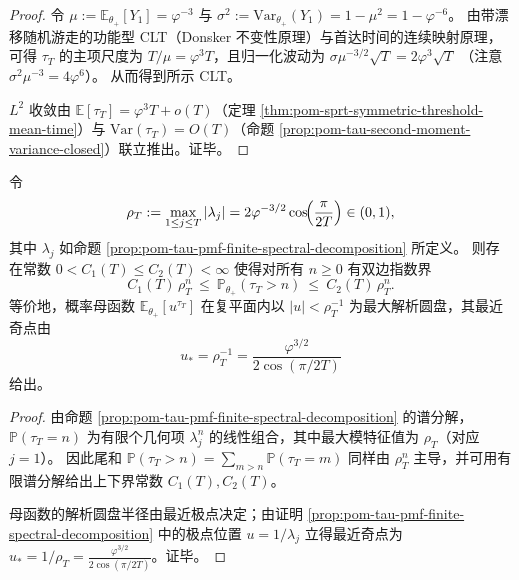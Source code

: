 \begin{proof}
令 \(\mu:=\mathbb{E}_{\theta_+}[Y_1]=\varphi^{-3}\) 与 \(\sigma^2:=\mathrm{Var}_{\theta_+}(Y_1)=1-\mu^2=1-\varphi^{-6}\)。
由带漂移随机游走的功能型 CLT（Donsker 不变性原理）与首达时间的连续映射原理，可得 \(\tau_T\) 的主项尺度为 \(T/\mu=\varphi^{3}T\)，且归一化波动为
\(
\sigma\mu^{-3/2}\sqrt{T}=2\varphi^{3}\sqrt{T}
\)
（注意 \(\sigma^2\mu^{-3}=4\varphi^6\)）。
从而得到所示 CLT。
\par
\(L^2\) 收敛由 \(\mathbb{E}[\tau_T]=\varphi^{3}T+o(T)\)（定理 \ref{thm:pom-sprt-symmetric-threshold-mean-time}）与
\(\mathrm{Var}(\tau_T)=O(T)\)（命题 \ref{prop:pom-tau-second-moment-variance-closed}）联立推出。证毕。
\end{proof}

\begin{proposition}\label{prop:pom-tau-exponential-tail-analytic-disk}
令
\[
\rho_T:=\max_{1\le j\le T}|\lambda_j|
=2\varphi^{-3/2}\cos\!\Bigl(\frac{\pi}{2T}\Bigr)\in(0,1),
\]
其中 \(\lambda_j\) 如命题 \ref{prop:pom-tau-pmf-finite-spectral-decomposition} 所定义。
则存在常数 \(0<C_1(T)\le C_2(T)<\infty\) 使得对所有 \(n\ge 0\) 有双边指数界
\[
\boxed{\;
C_1(T)\,\rho_T^{n}\ \le\ \mathbb{P}_{\theta_+}(\tau_T>n)\ \le\ C_2(T)\,\rho_T^{n}.\;}
\]
等价地，概率母函数 \(\mathbb{E}_{\theta_+}[u^{\tau_T}]\) 在复平面内以 \(|u|<\rho_T^{-1}\) 为最大解析圆盘，其最近奇点由
\[
\boxed{\;
u_*=\rho_T^{-1}=\frac{\varphi^{3/2}}{2\cos(\pi/2T)}\;}
\]
给出。
\end{proposition}

\begin{proof}
由命题 \ref{prop:pom-tau-pmf-finite-spectral-decomposition} 的谱分解，
\(
\mathbb{P}(\tau_T=n)
\)
为有限个几何项 \( \lambda_j^n \) 的线性组合，其中最大模特征值为 \(\rho_T\)（对应 \(j=1\)）。
因此尾和 \(\mathbb{P}(\tau_T>n)=\sum_{m>n}\mathbb{P}(\tau_T=m)\) 同样由 \(\rho_T^{n}\) 主导，并可用有限谱分解给出上下界常数 \(C_1(T),C_2(T)\)。
\par
母函数的解析圆盘半径由最近极点决定；由证明 \ref{prop:pom-tau-pmf-finite-spectral-decomposition} 中的极点位置 \(u=1/\lambda_j\) 立得最近奇点为 \(u_*=1/\rho_T=\frac{\varphi^{3/2}}{2\cos(\pi/2T)}\)。证毕。
\end{proof}

\endinput
